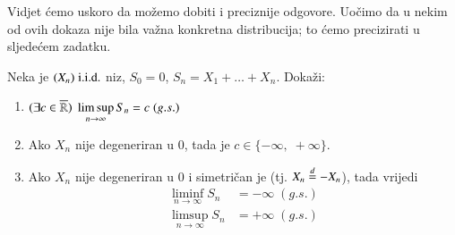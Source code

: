 Vidjet \' cemo uskoro da mo\v zemo dobiti i preciznije odgovore.
Uo\v cimo da u nekim od ovih dokaza nije bila va\v zna konkretna distribucija; to \' cemo precizirati u sljede\' cem zadatku.

\begin{zad} \label{zad:10.4}
    Neka je $(X_n) \; \mathrm{i.i.d.}$ niz, $S_0 = 0$, $S_n = X_1 + \ldots + X_n$.
    Doka\v zi:
    \begin{enumerate}[label=(\alph*)]
        \item $(\exists c \in \overline{\mathbb{R}})\; \limsup\limits_{n \to \infty} S_n = c \; (g.s.)$
        \item Ako $X_n$ nije degeneriran u $0$, tada je $c \in \{-\infty, \; +\infty\}$.
        \item Ako $X_n$ nije degeneriran u $0$ i simetri\v can je (tj. $X_n \overset{d}{=} - X_n$), tada vrijedi
        \begin{equation*}
            \begin{aligned}
                \liminf\limits_{n \to \infty} S_n &= - \infty \; (g.s.)\\
                \limsup\limits_{n \to \infty} S_n &= +\infty \; (g.s.)
            \end{aligned}
        \end{equation*}
    \end{enumerate}
\end{zad}